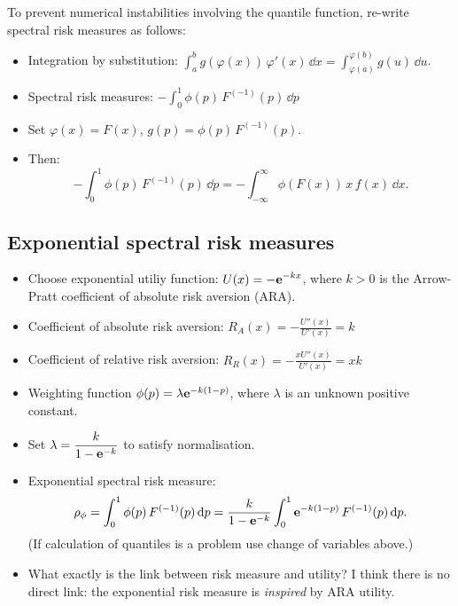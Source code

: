 \documentclass[square]{article} %
\theoremstyle{plain}
\theoremstyle{definition} %
\begin{document}
To prevent numerical instabilities involving the quantile function,
re-write spectral risk measures as follows:
\begin{itemize}
\item Integration by substitution: $\displaystyle \int_a^b
  g(\varphi(x)) \,\varphi'(x)\, \dd x = \int_{\varphi(a)}^{\varphi(b)}
  g(u)\, \dd u$.
\item Spectral risk measures: $\displaystyle -\int_0^1 \phi(p) \,
  F^{(-1)}(p)\, \dd p$
\item Set $\varphi(x)=F(x)$, $g(p) = \phi(p)\, F^{(-1)}(p)$.
\item Then:
  \begin{equation*}
    -\int_0^1 \phi(p)\, F^{(-1)}(p)\, \dd p = -\int_{-\infty}^\infty
    \phi(F(x))\, x\, f(x)\, \dd x.
  \end{equation*}
\end{itemize}


\subsection{Exponential spectral risk measures}
\label{sec:expon-risk-meas}

\begin{itemize}
\item Choose exponential utiliy function:
  $\displaystyle U(x) = -{\bf e}^{-k x}$, where $k>0$ is the Arrow-Pratt
  coefficient of absolute risk aversion
  (ARA).
\item Coefficient of absolute risk aversion: $\displaystyle R_A(x) =
  -\frac{U''(x)}{U'(x)} = k$
\item Coefficient of relative risk aversion: $\displaystyle R_R(x) = -
  \frac{x U''(x)}{U'(x)} = xk$
\item Weighting function $\phi(p) = \lambda {\bf e}^{-k(1-p)}$, where
  $\lambda$ is an unknown positive constant.
\item Set $\displaystyle\lambda = \frac{k}{1-{\bf e}^{-k}}$ to satisfy
  normalisation.
\item Exponential spectral risk measure:
  \begin{equation*}
    \rho_{\phi} = \int_0^1 \phi(p)\, F^{(-1)}(p)\, {\rm d} p =
    \frac{k}{1-{\bf e}^{-k}} \int_0^1 {\bf e}^{-k(1-p)}\, F^{(-1)}(p)\, {\rm d} p. 
  \end{equation*}
(If calculation of quantiles is a problem use change of variables
above.)
\item What exactly is the link between risk measure and utility?
    I think there is no direct link: the exponential risk measure is
   {\em inspired\/} by ARA utility.
\end{itemize}
\end{document}
